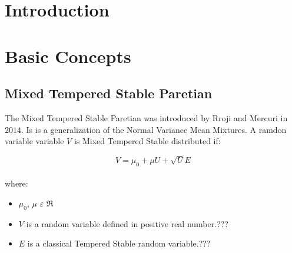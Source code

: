 \documentclass[12pt]{article}
\begin{document}
\newpage








\section{Introduction}









\section{Basic Concepts}





\subsection{Mixed Tempered Stable Paretian}


The Mixed Tempered Stable Paretian was introduced by Rroji and Mercuri \cite{Rroji_Mercuri} in $2014$. Is is a generalization of the Normal Variance Mean Mixtures.  A ramdon variable variable $V$ is Mixed Tempered Stable
distributed if:


\begin{equation}
V=\mu_{0} + \mu U +\sqrt{U} E
\label{eq_MTStable}
\end{equation}\\


where:\\

\begin{itemize}
\item $\mu_{0}$, $\mu$ $\varepsilon$ $\Re$
\item $V$ is a random variable defined in positive real number.???
\item $E$ is a classical Tempered Stable random variable.???
\end{itemize}
\end{document}
